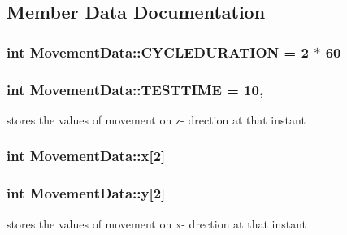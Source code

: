 \subsection{Member Data Documentation}
\hypertarget{classMovementData_abd2ebde61b24ecee8634bc0ad5a9d79c}{}
\subsubsection[{C\+Y\+C\+L\+E\+D\+U\+R\+A\+T\+I\+O\+N}]{\setlength{\rightskip}{0pt plus 5cm}int Movement\+Data\+::\+C\+Y\+C\+L\+E\+D\+U\+R\+A\+T\+I\+O\+N = 2 $\ast$ 60\hspace{0.3cm}{\ttfamily [static]}}\label{classMovementData_abd2ebde61b24ecee8634bc0ad5a9d79c}
\hypertarget{classMovementData_ac6c923b8f994f87231ec00efe4393333}{}
\subsubsection[{T\+E\+S\+T\+T\+I\+M\+E}]{\setlength{\rightskip}{0pt plus 5cm}int Movement\+Data\+::\+T\+E\+S\+T\+T\+I\+M\+E = 10\hspace{0.3cm}{\ttfamily [static]}, {\ttfamily [private]}}\label{classMovementData_ac6c923b8f994f87231ec00efe4393333}
stores the values of movement on z-\/ drection at that instant \hypertarget{classMovementData_a8bd69fc477e461a1adee4cfa8762817b}{}
\subsubsection[{x}]{\setlength{\rightskip}{0pt plus 5cm}int Movement\+Data\+::x\mbox{[}2\mbox{]}\hspace{0.3cm}{\ttfamily [private]}}\label{classMovementData_a8bd69fc477e461a1adee4cfa8762817b}
\hypertarget{classMovementData_afefc24b91fda0633c33b916eb70a9177}{}
\subsubsection[{y}]{\setlength{\rightskip}{0pt plus 5cm}int Movement\+Data\+::y\mbox{[}2\mbox{]}\hspace{0.3cm}{\ttfamily [private]}}\label{classMovementData_afefc24b91fda0633c33b916eb70a9177}
stores the values of movement on x-\/ drection at that instant \hypertarget{classMovementData_a319111ec5eb9f0adc4eda7e177e8eccd}{}
